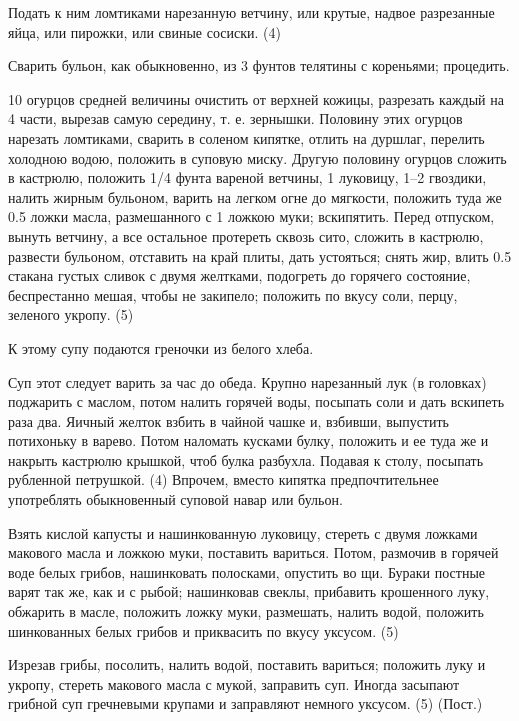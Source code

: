 Подать к ним ломтиками нарезанную ветчину, или крутые, надвое разрезанные яйца, или пирожки, или свиные сосиски. (4)


Сварить бульон, как обыкновенно, из 3 фунтов телятины с кореньями; процедить.

10 огурцов средней величины очистить от верхней кожицы, разрезать каждый на 4 части, вырезав самую середину, т. е. зернышки. Половину этих огурцов нарезать ломтиками, сварить в соленом кипятке, отлить на дуршлаг, перелить холодною водою, положить в суповую миску. Другую половину огурцов сложить в кастрюлю, положить 1/4 фунта вареной ветчины, 1 луковицу, 1–2 гвоздики, налить жирным бульоном, варить на легком огне до мягкости, положить туда же 0.5 ложки масла, размешанного с 1 ложкою муки; вскипятить. Перед отпуском, вынуть ветчину, а все остальное протереть сквозь сито, сложить в кастрюлю, развести бульоном, отставить на край плиты, дать устояться; снять жир, влить 0.5 стакана густых сливок с двумя желтками, подогреть до горячего состояние, беспрестанно мешая, чтобы не закипело; положить по вкусу соли, перцу, зеленого укропу. (5)

К этому супу подаются греночки из белого хлеба.


Суп этот следует варить за час до обеда. Крупно нарезанный лук (в головках) поджарить с маслом, потом налить горячей воды, посыпать соли и дать вскипеть раза два. Яичный желток взбить в чайной чашке и, взбивши, выпустить потихоньку в варево. Потом наломать кусками булку, положить и ее туда же и накрыть кастрюлю крышкой, чтоб булка разбухла. Подавая к столу, посыпать рубленной петрушкой. (4)
Впрочем, вместо кипятка предпочтительнее употреблять обыкновенный суповой навар или бульон.


Взять кислой капусты и нашинкованную луковицу, стереть с двумя ложками макового масла и ложкою муки, поставить вариться. Потом, размочив в горячей воде белых грибов, нашинковать полосками, опустить во щи. Бураки постные варят так же, как и с рыбой; нашинковав свеклы, прибавить крошенного луку, обжарить в масле, положить ложку муки, размешать, налить водой, положить шинкованных белых грибов и приквасить по вкусу уксусом. (5)


Изрезав грибы, посолить, налить водой, поставить вариться; положить луку и укропу, стереть макового масла с мукой, заправить суп. Иногда засыпают грибной суп гречневыми крупами и заправляют немного уксусом. (5) (Пост.)

